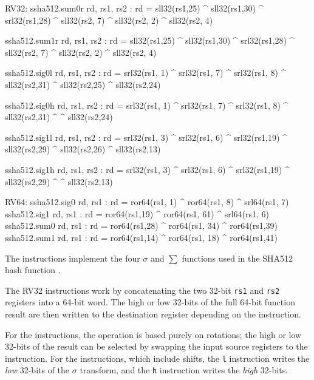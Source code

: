 \begin{cryptoisa}
RV32:
  ssha512.sum0r rd, rs1, rs2 : rd = sll32(rs1,25) ^ sll32(rs1,30)  ^ srl32(rs1,28) ^
                                    sll32(rs2, 7) ^ sll32(rs2, 2)  ^ sll32(rs2, 4)
  
  ssha512.sum1r rd, rs1, rs2 : rd = sll32(rs1,25) ^ sll32(rs1,30)  ^ srl32(rs1,28) ^
                                    sll32(rs2, 7) ^ sll32(rs2, 2)  ^ sll32(rs2, 4)
  
  ssha512.sig0l rd, rs1, rs2 : rd = srl32(rs1, 1) ^ srl32(rs1, 7) ^ srl32(rs1, 8) ^
                                    sll32(rs2,31) ^ sll32(rs2,25) ^ sll32(rs2,24)
  
  ssha512.sig0h rd, rs1, rs2 : rd = srl32(rs1, 1) ^ srl32(rs1, 7) ^ srl32(rs1, 8) ^
                                    sll32(rs2,31) ^               ^ sll32(rs2,24)
  
  ssha512.sig1l rd, rs1, rs2 : rd = srl32(rs1, 3) ^ srl32(rs1, 6) ^ srl32(rs1,19) ^
                                    sll32(rs2,29) ^ sll32(rs2,26) ^ sll32(rs2,13)
  
  ssha512.sig1h rd, rs1, rs2 : rd = srl32(rs1, 3) ^ srl32(rs1, 6) ^ srl32(rs1,19) ^
                                    sll32(rs2,29) ^               ^ sll32(rs2,13)

RV64:
  ssha512.sig0 rd, rs1 : rd = ror64(rs1, 1) ^ ror64(rs1,  8) ^ srl64(rs1, 7)
  ssha512.sig1 rd, rs1 : rd = ror64(rs1,19) ^ ror64(rs1, 61) ^ srl64(rs1, 6)
  ssha512.sum0 rd, rs1 : rd = ror64(rs1,28) ^ ror64(rs1, 34) ^ ror64(rs1,39)
  ssha512.sum1 rd, rs1 : rd = ror64(rs1,14) ^ ror64(rs1, 18) ^ ror64(rs1,41)
\end{cryptoisa}

The 
instructions implement the four $\sigma$ and $\sum$ functions used in
the SHA512 hash function \cite[Section 4.1.3]{nist:fips:180:4}.

The RV32 instructions work by concatenating the two 32-bit {\tt rs1} and
{\tt rs2} registers into a 64-bit word.
The high or low 32-bits of the full 64-bit function result are then
written to the destination register depending on the instruction.

For the  instructions, the operation is based
purely on rotations;
the high or low 32-bits of the result can be selected by swapping
the input source registers to the instruction.
For the  instructions, which include shifts,
the {\tt *l} instruction writes the {\em low} 32-bits of the $\sigma$
transform, and the {\tt *h} instruction writes the {\em high} 32-bits.

